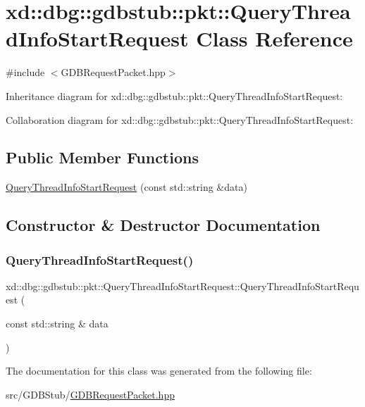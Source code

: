 \hypertarget{classxd_1_1dbg_1_1gdbstub_1_1pkt_1_1_query_thread_info_start_request}{}\section{xd\+:\+:dbg\+:\+:gdbstub\+:\+:pkt\+:\+:Query\+Thread\+Info\+Start\+Request Class Reference}
\label{classxd_1_1dbg_1_1gdbstub_1_1pkt_1_1_query_thread_info_start_request}


{\ttfamily \#include $<$G\+D\+B\+Request\+Packet.\+hpp$>$}



Inheritance diagram for xd\+:\+:dbg\+:\+:gdbstub\+:\+:pkt\+:\+:Query\+Thread\+Info\+Start\+Request\+:


Collaboration diagram for xd\+:\+:dbg\+:\+:gdbstub\+:\+:pkt\+:\+:Query\+Thread\+Info\+Start\+Request\+:
\subsection*{Public Member Functions}
\begin{DoxyCompactItemize}
\item 
\mbox{\hyperlink{classxd_1_1dbg_1_1gdbstub_1_1pkt_1_1_query_thread_info_start_request_afa1c5286a4164e2f04f7eea01adb4f33}{Query\+Thread\+Info\+Start\+Request}} (const std\+::string \&data)
\end{DoxyCompactItemize}


\subsection{Constructor \& Destructor Documentation}
\mbox{\label{classxd_1_1dbg_1_1gdbstub_1_1pkt_1_1_query_thread_info_start_request_afa1c5286a4164e2f04f7eea01adb4f33}} 
\subsubsection{\texorpdfstring{Query\+Thread\+Info\+Start\+Request()}{QueryThreadInfoStartRequest()}}
{\footnotesize\ttfamily xd\+::dbg\+::gdbstub\+::pkt\+::\+Query\+Thread\+Info\+Start\+Request\+::\+Query\+Thread\+Info\+Start\+Request (\begin{DoxyParamCaption}\item[{const std\+::string \&}]{data }\end{DoxyParamCaption})\hspace{0.3cm}{\ttfamily [inline]}}



The documentation for this class was generated from the following file\+:\begin{DoxyCompactItemize}
\item 
src/\+G\+D\+B\+Stub/\mbox{\hyperlink{_g_d_b_request_packet_8hpp}{G\+D\+B\+Request\+Packet.\+hpp}}\end{DoxyCompactItemize}
